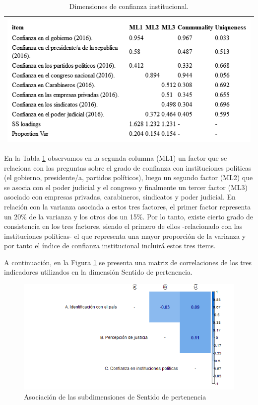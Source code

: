 \documentclass[
  12pt,
]{book}
\begin{document}
\begin{longtable}[]{@{}l@{}}
\caption{\label{tab:inst-fa}Dimensiones de confianza institucional.}\tabularnewline
\toprule
\endhead
\includegraphics[width=8.33333in,height=\textheight]{output/tables/inst_fa.png}\tabularnewline
\bottomrule
\end{longtable}

En la Tabla \ref{tab:inst-fa} observamos en la segunda columna (ML1) un factor que se relaciona con las preguntas sobre el grado de confianza con instituciones políticas (el gobierno, presidente/a, partidos políticos), luego un segundo factor (ML2) que se asocia con el poder judicial y el congreso y finalmente un tercer factor (ML3) asociado con empresas privadas, carabineros, sindicatos y poder judicial. En relación con la varianza asociada a estos tres factores, el primer factor representa un 20\% de la varianza y los otros dos un 15\%. Por lo tanto, existe cierto grado de consistencia en los tres factores, siendo el primero de ellos -relacionado con las instituciones políticas- el que representa una mayor proporción de la varianza y por tanto el índice de confianza institucional incluirá estos tres items.

A continuación, en la Figura \ref{fig:sentido-pertenencia} se presenta una matriz de correlaciones de los tres indicadores utilizados en la dimensión Sentido de pertenencia.

\begin{figure}[H]

{\centering \includegraphics[width=1\linewidth,height=1\textheight]{output/graphs/pertenencia_cor} 

}

\caption{Asociación de las subdimensiones de Sentido de pertenencia}\label{fig:sentido-pertenencia}
\end{figure}
\end{document}
